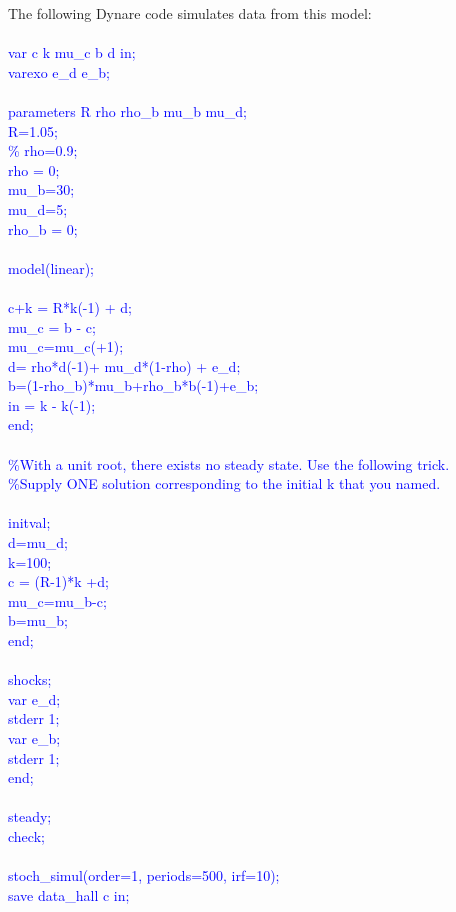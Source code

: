 \documentclass[a4paper,12pt]{scrartcl} %
\begin{document}
The following Dynare code simulates data from this model:\\
\\
\textcolor{blue}{
var c k mu\_c b d in;\\
varexo e\_d e\_b;\\
\\
parameters R rho rho\_b mu\_b mu\_d;\\
R=1.05;\\
\% rho=0.9;\\
rho = 0;\\
mu\_b=30;\\
mu\_d=5;\\
rho\_b = 0;\\
\\
model(linear);\\
\\
 c+k = R*k(-1) + d;\\
 mu\_c = b - c;\\
 mu\_c=mu\_c(+1);\\
 d= rho*d(-1)+ mu\_d*(1-rho) + e\_d;\\
 b=(1-rho\_b)*mu\_b+rho\_b*b(-1)+e\_b;\\
 in = k - k(-1);\\
 end;\\
\\
\%With a unit root, there exists no steady state.  Use the following trick.\\
\%Supply ONE solution corresponding to the initial k that you named.\\
\\
initval;\\
d=mu\_d;\\
k=100;\\
c = (R-1)*k +d;\\
mu\_c=mu\_b-c;\\
b=mu\_b;\\
end;\\
\\
shocks;\\
var e\_d;\\
stderr 1;\\
var e\_b;\\
stderr 1;\\
end;\\
\\
steady;\\
check;\\
\\
stoch\_simul(order=1, periods=500, irf=10);\\
save data\_hall c in;}\\
\end{document}
